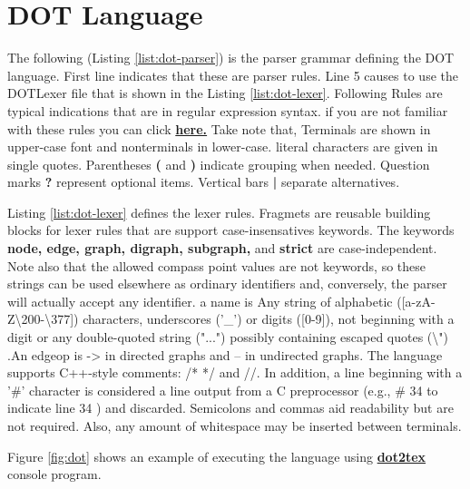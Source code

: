 \section{DOT Language}
The following (Listing \ref{list:dot-parser}) is the parser grammar 
defining the DOT language. First line indicates that these
are parser rules. Line 5 causes to use the DOTLexer file that is shown
in the Listing \ref{list:dot-lexer}. 
Following Rules are typical indications that are in regular expression
syntax. if you are not familiar with these rules you can click
\href{https://en.wikipedia.org/wiki/Regular_expression#Syntax}{\textbf{here.}}
Take note that, Terminals are shown in 
upper-case font and nonterminals in lower-case.
literal characters are given 
in single quotes. Parentheses \textbf{(} and \textbf{)} indicate 
grouping when needed. Question marks \textbf{?} 
represent optional items. Vertical bars \textbf{|} 
separate alternatives.



Listing \ref{list:dot-lexer} defines the lexer rules. Fragmets 
are reusable building blocks for lexer rules that are support
case-insensatives keywords.
The keywords \textbf{node, edge, graph, digraph, 
subgraph,} and \textbf{strict} are case-independent. Note also that 
the allowed compass point values are not keywords, so these 
strings can be used elsewhere as ordinary identifiers and, 
conversely, the parser will actually accept any identifier.
a name is Any string of alphabetic 
([a-zA-Z\textbackslash 200-\textbackslash 377]) characters, 
underscores ('_') or digits ([0-9]), not beginning 
with a digit or any double-quoted string ("...") possibly 
containing escaped quotes (\textbackslash ") .An edgeop is -> in directed graphs 
and -- in undirected graphs.
The language supports C++-style 
comments: /* */ and //. In addition, a line beginning 
with a '\#' character is considered a line output from 
a C preprocessor (e.g., \# 34 to indicate line 34 ) and discarded.
Semicolons and commas aid readability but are not 
required. Also, any amount of whitespace may be inserted 
between terminals.


Figure \ref{fig:dot} shows an example of executing the 
language using 
\href{https://dot2tex.readthedocs.io/en/latest/}{\textbf{dot2tex}} 
console program.

